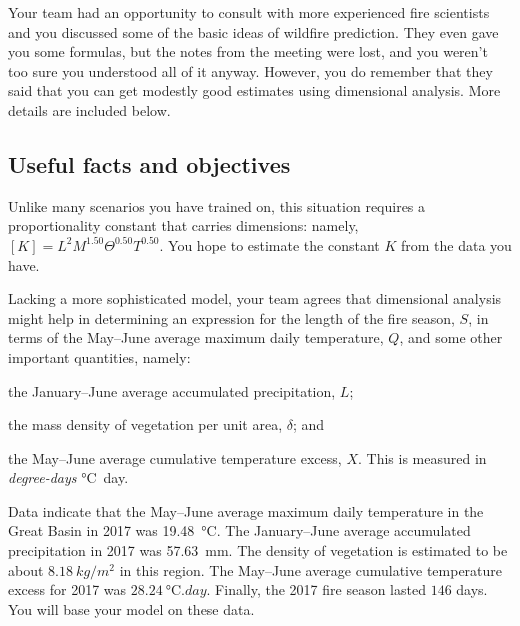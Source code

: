 \documentclass[11pt]{article}\usepackage[]{graphicx}\usepackage[]{color}
\begin{document}
    Your team had an opportunity to consult with more experienced
    fire scientists and you discussed some of the basic ideas of wildfire
    prediction. They even gave you some formulas, but the notes from the
    meeting were lost, and you weren't too sure you understood all of it
    anyway. However, you do remember that they said that you can get
    modestly good estimates using dimensional analysis. More details are
    included below.

\subsection*{Useful facts and objectives}

    \begin{compactitem}

        \item Unlike many scenarios you have trained on, this situation
        requires a proportionality constant that carries dimensions: namely,
        $[K] = L^{2} M^{1.50} \Theta^{0.50} T^{0.50}$.
        You hope to estimate the constant $K$ from the data you have.

        \item Lacking a more sophisticated model, your team agrees that
        dimensional analysis might help in determining an expression for the
        length of the fire season, $S$, in terms of the May--June average
        maximum daily temperature, $Q$, and some other important quantities,
        namely:
        \begin{compactenum}
            \item the January--June average accumulated precipitation, $L$;
            \item the mass density of vegetation per unit area, $\delta$; and
            \item the May--June average cumulative temperature excess, $X$. This
            is measured in \emph{degree-days} \si{\celsius.day}.
        \end{compactenum}

        \item Data indicate that the May--June average maximum daily temperature in
        the Great Basin in 2017 was
        \SI{19.48}{\celsius}. The January--June average
        accumulated precipitation in 2017 was
        \SI{57.63}{mm}. The density of vegetation is
        estimated to be about $\SI{8.18}{kg/m^2}$ in this region.
        The May--June average cumulative temperature excess for 2017 was
        $\SI{28.24}{\celsius.day}$. Finally, the 2017 fire season
        lasted $\num{146}$ days. You will base your model on these
        data.


\end{compactitem}
\end{document}

